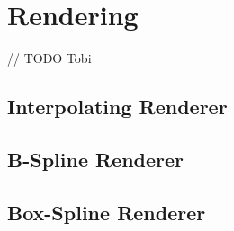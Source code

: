 \section{Rendering} \label{sec:rendering}

// TODO Tobi

\subsection{Interpolating Renderer}

\subsection{B-Spline Renderer}

\subsection{Box-Spline Renderer}

